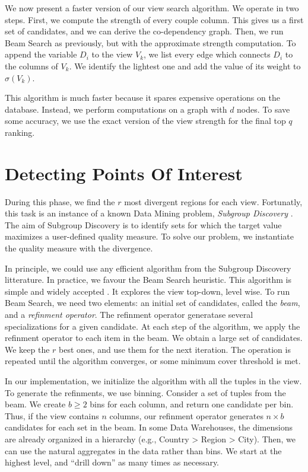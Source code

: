 We now present a faster version of our view search algorithm.  We operate in
two steps. First, we compute the strength of every couple column.  This gives
us a first set of candidates, and we can derive the co-dependency graph.  Then,
we run Beam Search as previously, but with the approximate strength computation.
To append the variable $D_i$ to the view $V_k$, we list every edge which
connects  $D_i$ to the columns of $V_k$. We identify the lightest one and add
the value of its weight to $\sigma(V_k)$.  

This algorithm is much faster because it spares expensive operations on the
database. Instead, we perform computations on a graph with $d$ nodes.  To save
some accuracy, we use the exact version of the view strength for the final top
$q$ ranking.

\section{Detecting Points Of Interest}
\label{sec:detec}

During this phase, we find the $r$ most divergent regions for each view.
Fortunatly, this task is an instance of a known Data Mining problem,
\emph{Subgroup Discovery} \cite{klosgen1996explora}\cite{wrobel1997algorithm}.
The aim of Subgroup Discovery is to identify sets for which the target value
maximizes a user-defined quality measure. To solve our problem, we instantiate
the quality measure with the divergence.

In principle, we could use any efficient algorithm from the Subgroup Discovery
litterature.  In practice, we favour the Beam Search heuristic. This algorithm
is simple and widely accepted \cite{van2011non}. It explores the view top-down,
level wise. To run Beam Search, we need two elements: an initial set of
candidates, called the \emph{beam}, and a \emph{refinment operator}. The
refinment operator generatase several specializations for a given candidate. At
each step of the algorithm, we apply the refinment operator to each item in the
beam. We obtain a large set of candidates. We keep the $r$ best ones, and use
them for the next iteration. The operation is repeated until the algorithm
converges, or some minimum cover threshold is met.

In our implementation, we initialize the algorithm with all the tuples in the
view.  To generate the refinments, we use binning.  Consider a set of tuples
from the beam.  We create $b \geq 2$ bins for each column, and return one
candidate per bin. Thus, if the view contains $n$ columns, our refinment
operator generates $n \times b$ candidates for each set in the beam.  In some
Data Warehouses, the dimensions are already organized in a hierarchy (e.g.,
Country > Region > City). Then, we can use the natural aggregates
in the data rather than bins. We start at the highest level, and ``drill down''
as many times as necessary.

